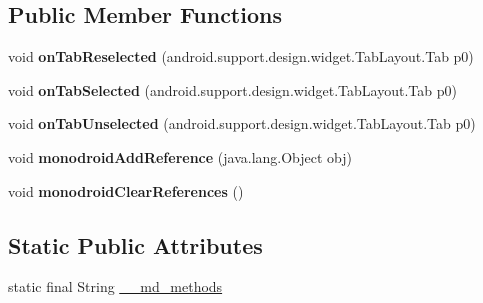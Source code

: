 \subsection*{Public Member Functions}
\begin{DoxyCompactItemize}
\item 
\mbox{\label{classmono_1_1android_1_1support_1_1design_1_1widget_1_1_tab_layout___on_tab_selected_listener_implementor_a7ec2a49269664d99cb90d0e2a341da9d}} 
void {\bfseries on\+Tab\+Reselected} (android.\+support.\+design.\+widget.\+Tab\+Layout.\+Tab p0)
\item 
\mbox{\label{classmono_1_1android_1_1support_1_1design_1_1widget_1_1_tab_layout___on_tab_selected_listener_implementor_ae5e2165f79658a8e289dff880f9eeeec}} 
void {\bfseries on\+Tab\+Selected} (android.\+support.\+design.\+widget.\+Tab\+Layout.\+Tab p0)
\item 
\mbox{\label{classmono_1_1android_1_1support_1_1design_1_1widget_1_1_tab_layout___on_tab_selected_listener_implementor_ac7d1b1a44df7eb306b35a80be1ef03bd}} 
void {\bfseries on\+Tab\+Unselected} (android.\+support.\+design.\+widget.\+Tab\+Layout.\+Tab p0)
\item 
\mbox{\label{classmono_1_1android_1_1support_1_1design_1_1widget_1_1_tab_layout___on_tab_selected_listener_implementor_ac366225a0b919fe8a7df0dce363784e6}} 
void {\bfseries monodroid\+Add\+Reference} (java.\+lang.\+Object obj)
\item 
\mbox{\label{classmono_1_1android_1_1support_1_1design_1_1widget_1_1_tab_layout___on_tab_selected_listener_implementor_ad3e27d3383e787abab61553c3ff8efba}} 
void {\bfseries monodroid\+Clear\+References} ()
\end{DoxyCompactItemize}
\subsection*{Static Public Attributes}
\begin{DoxyCompactItemize}
\item 
static final String \hyperlink{classmono_1_1android_1_1support_1_1design_1_1widget_1_1_tab_layout___on_tab_selected_listener_implementor_a69fdb2fbe45dfaa066204c67c40d6229}{\+\_\+\+\_\+md\+\_\+methods}
\end{DoxyCompactItemize}


